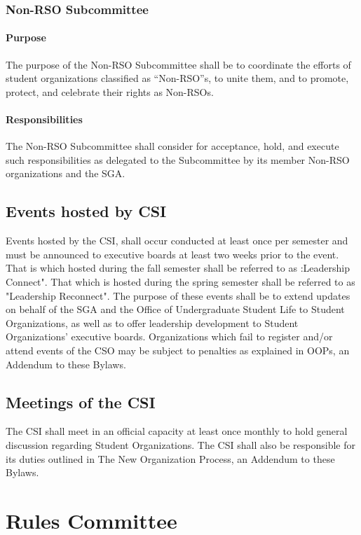 \documentclass[12pt]{scrreprt}
\begin{document}
\subsubsection{Non-RSO Subcommittee}

\paragraph{Purpose}
The purpose of the Non-RSO Subcommittee shall be to coordinate the efforts of
student organizations classified as “Non-RSO”s, to unite them, and to promote, protect, and
celebrate their rights as Non-RSOs.

\paragraph{Responsibilities}
The Non-RSO Subcommittee shall consider for acceptance, hold, and
execute such responsibilities as delegated to the Subcommittee by its member Non-RSO
organizations and the SGA.

\subsection{Events hosted by CSI}
Events hosted by the CSI,  shall occur conducted at least once per semester and must be announced to executive boards at least two weeks prior to the event. That is which hosted during the fall semester shall be referred to as :Leadership Connect". That which is hosted during the spring semester shall be referred to as "Leadership Reconnect". The purpose of these events shall be to extend updates on behalf of the SGA
and the Office of Undergraduate Student Life to Student Organizations, as well as to offer
leadership development to Student Organizations’ executive boards. Organizations which fail to register and/or attend events of the CSO may be subject to penalties as explained in OOPs, an Addendum to these Bylaws.

\subsection{Meetings of the CSI}
The CSI shall meet in an official capacity at least once monthly to hold general discussion regarding Student Organizations.
The CSI shall also be responsible for its duties outlined in The New Organization Process, an 
Addendum to these Bylaws.

\section{Rules Committee}
\end{document}
